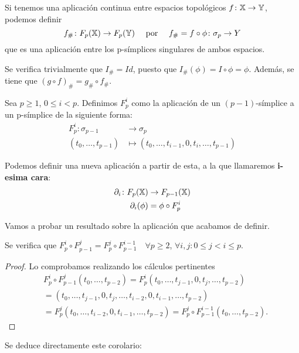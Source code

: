 Si tenemos una aplicación continua entre espacios topológicos $f \colon {\mathbb X} \to {\mathbb Y}$, podemos definir
\[f_{\#} \colon F_{p}({\mathbb X}) \to F_{p}({\mathbb Y})  \quad \text{ por }  \quad f_{\#} = f \circ \phi \colon \sigma_p \to Y \]
que es una aplicación entre los p-símplices singulares de ambos espacios.

Se verifica trivialmente que $I_\# = Id$, puesto que $I_\#(\phi) = I \circ \phi = \phi$.
Además, se tiene que $(g \circ f)_\# = g_\# \circ f_\#$.

\begin{definition}
  Sea $p \geq 1$, $0 \leq i < p$. Definimos $F_p^i$ como la aplicación de un $(p-1)$-símplice a un p-símplice de la siguiente forma:
  \begin{align*}
    F_p^i \colon \sigma_{p-1} &\to \sigma_p\\
    (t_0, \dots, t_{p-1}) &\mapsto (t_0, \dots, t_{i-1}, 0, t_i, \dots, t_{p-1})
  \end{align*}

  Podemos definir una nueva aplicación a partir de esta, a la que llamaremos \textbf{i-esima cara}:
  \begin{align*}
    \partial_i \colon F_{p}({\mathbb X}) &\to F_{p-1}({\mathbb X})\\
    \partial_i(\phi) &= \phi \circ F_p^i
  \end{align*}
\end{definition}

Vamos a probar un resultado sobre la aplicación que acabamos de definir.

\begin{lemma}
  Se verifica que $F_p^i \circ F_{p-1}^j = F_p^j \circ F_{p-1}^{i-1} \quad \forall p \geq 2$, $\forall i, j \colon 0 \leq j < i \leq p$.
\end{lemma}

\begin{proof}
Lo comprobamos realizando los cálculos pertinentes
  \begin{align*}
    &F_p^i \circ F_{p-1}^j (t_0, \dots, t_{p-2}) = F_p^i (t_0, \dots, t_{j-1}, 0, t_j, \dots, t_{p-2}) \\
    &= (t_0, \dots, t_{j-1}, 0, t_j, \dots, t_{i-2}, 0, t_{i-1}, \dots, t_{p-2}) \\
    &= F_p^j (t_0, \dots, t_{i-2}, 0, t_{i-1}, \dots, t_{p-2}) = F_p^j \circ F_{p-1}^{i-1} (t_0, \dots, t_{p-2}).
  \end{align*}
\end{proof}

Se deduce directamente este corolario:

